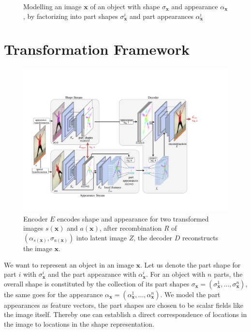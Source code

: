 	\begin{figure}[htp]
		\centering
		
		\caption{Modelling an image $\mathbf{x}$ of an object with shape ${\sigma}_{\mathbf{x}}$ and appearance $\alpha_{\mathbf{x}}$, by factorizing into part shapes ${{\sigma}}^i_{\mathbf{x}}$ and part appearances ${\alpha}^i_{\mathbf{x}}$}
		\label{fig:representation}
	\end{figure}

\section{Transformation Framework}\label{sec:framework}
	\begin{figure}[t]
		\centering
		\includegraphics[trim={0cm 0cm 0cm 0cm},clip, width=1.\linewidth]{fig/architecture_final}
		\caption{Encoder $E$ encodes shape and appearance for two transformed images $s(\mathbf{x})$ and $a(\mathbf{x})$, after recombination $R$ of $({\alpha}_{s(\mathbf{x})}, {\sigma}_{a(\mathbf{x})})$ into latent image $Z$, the decoder $D$ reconstructs the image $\mathbf{x}$.}
		\label{fig:architecture}
	\end{figure}
	We want to represent an object in an image $\mathbf{x}$. Let us denote the part shape for part $i$ with ${\sigma}^i_\mathbf{x}$ and the part appearance with ${\alpha}^i_\mathbf{x}$. For an object with $n$ parts, the overall shape is constituted by the collection of its part shapes ${\sigma}_\mathbf{x} =  ({\sigma}^1_\mathbf{x}, ...,  {\sigma}^n_\mathbf{x})$, the same goes for the appearance ${\alpha}_\mathbf{x} =  (\alpha^1_\mathbf{x}, ...,  \alpha^n_\mathbf{x})$. We model the part appearances as feature vectors, the part shapes are chosen to be scalar fields like the image itself. Thereby one can establish a direct correspondence of locations in the image to locations in the shape representation.\\
